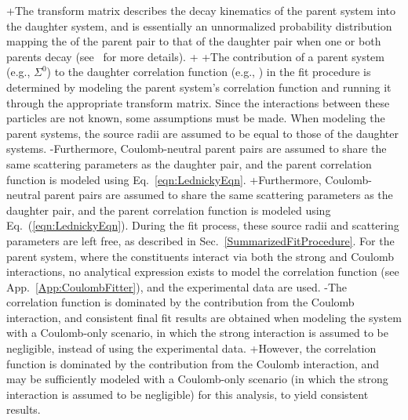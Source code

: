 +The transform matrix describes the decay kinematics of the parent system into the daughter system, and is essentially an unnormalized probability distribution mapping the \kstar of the parent pair to that of the daughter pair when one or both parents decay (see~\cite{Kisiel:2014mma} for more details).
+
+The contribution of a parent system (e.g., $\Sigma^{0}$\KchP) to the daughter correlation function (e.g., \LamKchP) in the fit procedure is determined by modeling the parent system's correlation function and running it through the appropriate transform matrix.
 Since the interactions between these particles are not known, some assumptions must be made.
 When modeling the parent systems, the source radii are assumed to be equal to those of the daughter \LamK systems.
-Furthermore, Coulomb-neutral parent pairs are assumed to share the same scattering parameters as the \LamK daughter pair, and the parent correlation function is modeled using Eq.~\ref{eqn:LednickyEqn}.
+Furthermore, Coulomb-neutral parent pairs are assumed to share the same scattering parameters as the \LamK daughter pair, and the parent correlation function is modeled using Eq.~(\ref{eqn:LednickyEqn}).
 During the fit process, these source radii and scattering parameters are left free, as described in Sec.~\ref{SummarizedFitProcedure}.
 For the \XiKpm parent system, where the constituents interact via both the strong and Coulomb interactions, no analytical expression exists to model the correlation function (see App.~\ref{App:CoulombFitter}), and the experimental \XiKpm data are used.
-The \XiKpm correlation function is dominated by the contribution from the Coulomb interaction, and consistent final fit results are obtained when modeling \XiKpm the system with a Coulomb-only scenario, in which the strong interaction is assumed to be negligible, instead of using the experimental data.
+However, the \XiKpm correlation function is dominated by the contribution from the Coulomb interaction, and may be sufficiently modeled with a Coulomb-only scenario (in which the strong interaction is assumed to be negligible) for this analysis, to yield consistent results.
 
 
 
